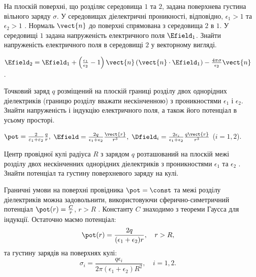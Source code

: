 \begin{problem}
    На плоскій поверхні, що розділяє середовища $1$ та $2$, задана поверхнева густина вільного заряду $\sigma$. У середовищах діелектричні проникності, відповідно, $\epsilon_1 > 1$ та $\epsilon_2 > 1$ . Нормаль $\vect{n}$ до поверхні спрямована з середовища $2$ в $1$. У середовищі $1$ задана напруженість електричного поля $\Efield_1$. Знайти напруженість електричного поля в середовищі $2$ у векторному вигляді.
\begin{solution}
    $\Efield_2 = \Efield_1 + \left( \frac{\epsilon_1}{\epsilon _2} - 1 \right)\vect{n}\left( \vect{n} \cdot \Efield_1 \right) - \frac{4\pi \sigma }{\epsilon _2}{\vect{n}}$.
\end{solution}
\end{problem}

\begin{problem}
Точковий заряд $q$ розміщений на плоскій границі розділу двох однорідних  діелектриків (границю розділу вважати нескінченною) з проникностями $\epsilon_{1}$ і $\epsilon_{2}$. Знайти напруженість і індукцію електричного поля, а також його потенціал в усьому просторі.
\begin{solution}
	$
		\pot  = \frac{2}{{{\varepsilon _1} + {\varepsilon _2}}}\frac{q}{r},
	$
	$
		\Efield = \frac{2q}{\epsilon_1 + \epsilon_2}\frac{\vect{r}}{r^3},
	$
	$ \Dfield_i = \frac{2\epsilon_i}{\epsilon_1 + \epsilon_2}\frac{q\vect{r}}{r^3} $ ($i = 1,2$).
\end{solution}
\end{problem}


\begin{problem}
Центр провідної кулі радіуса $R$  з зарядом $q$  розташований на плоскій межі розділу двох нескінченних однорідних діелектриків з проникностями $\epsilon_1$ та $\epsilon_2$ . Знайти потенціал та густину поверхневого заряду на кулі.
\begin{solution}
	Граничні умови на поверхні провідника $\pot = \const$  та межі розділу діелектриків можна задовольнити, використовуючи сферично-симетричний потенціал  $\pot(r) = \frac{C}{r}$, $r > R$ . Константу $C$ знаходимо з теореми Гаусса для індукції. Остаточно маємо потенціал:
	\[
		\pot(r) = \frac{2q}{(\epsilon_1 + \epsilon_2)r}, \quad r > R,
	\]
	та густину зарядів на поверхнях кулі:
	\[
		\sigma_i = \frac{q\epsilon_i}{2\pi(\epsilon_1 + \epsilon_2)R^2}, \quad i = 1,2.
	\]
\end{solution}
\end{problem}

